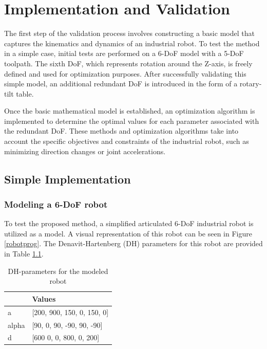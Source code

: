 \chapter{Implementation and Validation}%

The first step of the validation process involves constructing a basic model that captures the kinematics and dynamics of an industrial robot. To test the method in a simple case, initial tests are performed on a 6-DoF model with a 5-DoF toolpath. The sixth DoF, which represents rotation around the Z-axis, is freely defined and used for optimization purposes. After successfully validating this simple model, an additional redundant DoF is introduced in the form of a rotary-tilt table.

Once the basic mathematical model is established, an optimization algorithm is implemented to determine the optimal values for each parameter associated with the redundant DoF. These methods and optimization algorithms take into account the specific objectives and constraints of the industrial robot, such as minimizing direction changes or joint accelerations.



\section{Simple Implementation}%
\subsection{Modeling a 6-DoF robot}
To test the proposed method, a simplified articulated 6-DoF industrial robot is utilized as a model. A visual representation of this robot can be seen in Figure \ref{robotprog}. The Denavit-Hartenberg (DH) parameters for this robot are provided in Table \ref{DH}.

\begin{table}[H]
	\centering
	\begin{tabular}{||l|l||}
		  & Values \\
		\hline
		\hline
		\hline
		a	&		[200, 900, 150, 0,   150, 0] \\
		alpha	&  	[90,  0,   90,  -90, 90,  -90] \\
		d	& 		[600  0,   0,   800, 0,   200]\\
		
		\hline
		\hline
	\end{tabular}
	
	\caption{DH-parameters for the modeled robot}
	\label{DH}
\end{table}

